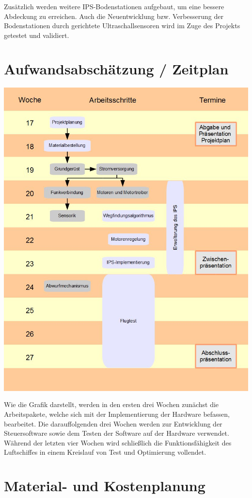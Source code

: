 \documentclass[lang=ngerman,inputenc=utf8,fontsize=10pt]{ldvarticle}
\begin{document}
Zusätzlich werden weitere IPS-Bodenstationen aufgebaut, um eine bessere Abdeckung zu erreichen. Auch die Neuentwicklung bzw. Verbesserung der Bodenstationen durch gerichtete Ultraschallsensoren wird im Zuge des Projekts getestet und validiert.


\section{Aufwandsabschätzung / Zeitplan}

\includegraphics[scale=0.5]{Zeitplan-Arbeitspakete}

Wie die Grafik darstellt, werden in den ersten drei Wochen zunächst die Arbeitspakete, welche sich mit der Implementierung der Hardware befassen, bearbeitet. Die darauffolgenden drei Wochen werden zur Entwicklung der Steuersoftware sowie dem Testen der Software auf der Hardware verwendet. Während der letzten vier Wochen wird schließlich die Funktionsfähigkeit des Luftschiffes in einem Kreislauf von Test und Optimierung vollendet.


\section{Material- und Kostenplanung}
\end{document}
